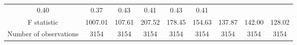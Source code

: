 \begin{tabular}{lllllllll}
  \multicolumn{1}{c}{0.40} &
  \multicolumn{1}{c}{0.37} &
  \multicolumn{1}{c}{0.43} &
  \multicolumn{1}{c}{0.41} &
  \multicolumn{1}{c}{0.43} &
  \multicolumn{1}{c}{0.41} \\
\multicolumn{1}{c}{F statistic} &
  \multicolumn{1}{c}{1007.01} &
  \multicolumn{1}{c}{107.61} &
  \multicolumn{1}{c}{207.52} &
  \multicolumn{1}{c}{178.45} &
  \multicolumn{1}{c}{154.63} &
  \multicolumn{1}{c}{137.87} &
  \multicolumn{1}{c}{142.00} &
  \multicolumn{1}{c}{128.02} \\
\multicolumn{1}{c}{Number of observations} &
  \multicolumn{1}{c}{3154} &
  \multicolumn{1}{c}{3154} &
  \multicolumn{1}{c}{3154} &
  \multicolumn{1}{c}{3154} &
  \multicolumn{1}{c}{3154} &
  \multicolumn{1}{c}{3154} &
  \multicolumn{1}{c}{3154} &
  \multicolumn{1}{c}{3154} \\
\cline{1-9}
\end{tabular}
